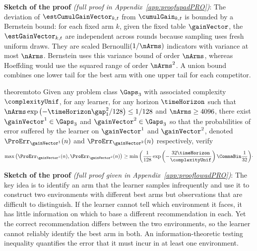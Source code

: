 \noindent\textbf{Sketch of the proof} \textit{(full proof in 
	Appendix~\ref{app:proofupadPRO})}:
The deviation of
$\estCumulGainVector_{k,t}$ from $\cumulGain_{k,t}$ is bounded by
a Bernstein bound: for each fixed arm $k$, given the fixed table
$\gainVector$, the $\estGainVector_{k,t}$ are independent across rounds
because sampling uses fresh uniform draws. They are scaled
Bernoulli$(1/\nArms)$ indicators with variance at most $\nArms$.
Bernstein uses this variance bound of order $\nArms$, whereas Hoeffding
would use the squared range of order $\nArms^2$.
A union bound combines one lower tail for the best arm with one
upper tail for each competitor.
%
\begin{restatable}[\textcolor{titleTh}{Lower bound for the adversarial problem}]{theorem}{toto}\label{th:LOWadPRO}
	Given any problem class $\Gaps_{3}$ with associated complexity
	$\complexityUnif$,    
	for any learner, for any horizon $\timeHorizon$ such that    
	$\nArms\exp\left( -\timeHorizon\gap^2_1 /128\right)\leq 1/128$ and $\nArms\geq 4096$, there exist 
	$\gainVector^1\in\Gaps_{3}$ and $\gainVector^2\in\Gaps_{3}$ so that  
	the  probabilities of error suffered by the learner on 
	$\gainVector^1$ and $\gainVector^2$, denoted $\ProErr_{\gainVector^1}(n)$ 
	and  $\ProErr_{\gainVector^2}(n)$ respectively, verify
	\[
	\max\left(\ProErr_{\gainVector^1}(n),\ProErr_{\gainVector^2}(n)\right)
	\geq
	\min\left(
	\frac{1}{128}\exp\left(-\frac{32\timeHorizon}{\complexityUnif}\right)\CommaBin
	\frac{1}{32}
	\right)\!\cdot
	\]     
\end{restatable}
%
\noindent\textbf{Sketch of the proof} \textit{(full proof given 
	in Appendix~\ref{app:prooflowadPRO})}:
The key idea is to identify an arm that the learner samples infrequently and
use it to construct two environments with different best arms but observations
that are difficult to distinguish. If the learner cannot tell which environment
it faces, it has little information on which to base a different recommendation
in each. Yet the correct recommendation differs between the two environments,
so the learner cannot reliably identify the best arm in both. An
information-theoretic testing inequality quantifies the error that it must
incur in at least one environment.

